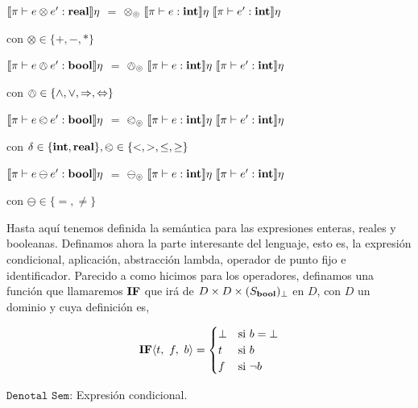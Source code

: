 $\llbracket \pi \vdash e \otimes e' : \textbf{real} \rrbracket\eta$ $=$
$\otimes_{\circledcirc} \ \llbracket \pi \vdash e : \textbf{int} \rrbracket\eta \
						\llbracket \pi \vdash e' : \textbf{int} \rrbracket\eta$

\begin{center}
con $\otimes \in \{+,-,*\}$
\end{center}

$\llbracket \pi \vdash e \owedge e' : \textbf{bool} \rrbracket\eta$ $=$
$\owedge_{\circledcirc} \ \llbracket \pi \vdash e : \textbf{int} \rrbracket\eta \
						\llbracket \pi \vdash e' : \textbf{int} \rrbracket\eta$

\begin{center}
con $\owedge \in \{\wedge,\vee,\Rightarrow,\Leftrightarrow\}$
\end{center}

$\llbracket \pi \vdash e \olessthan e' : \textbf{bool} \rrbracket\eta$ $=$ 
$\olessthan_{\circledcirc} \ \llbracket \pi \vdash e : \textbf{int} \rrbracket\eta \
						\llbracket \pi \vdash e' : \textbf{int} \rrbracket\eta$

\begin{center}
con $\delta \in \{\textbf{int}, \textbf{real} \}, \olessthan \in \{<,>,\leq,\geq\}$
\end{center}

$\llbracket \pi \vdash e \ominus e' : \textbf{bool} \rrbracket\eta$ $=$ 
$\ominus_{\circledcirc} \ \llbracket \pi \vdash e : \textbf{int} \rrbracket\eta \
						\llbracket \pi \vdash e' : \textbf{int} \rrbracket\eta$

\begin{center}
con $\ominus \in \{=,\neq\}$
\end{center}

Hasta aqu\'i tenemos definida la sem\'antica para las expresiones enteras,
reales y booleanas. Definamos ahora la parte interesante del lenguaje, esto 
es, la expresi\'on condicional, aplicaci\'on, abstracci\'on lambda, operador
de punto fijo e identificador. Parecido a como hicimos para los operadores,
definamos una funci\'on que llamaremos $\textbf{IF}$ que ir\'a de $D \times D \times (S_{\textbf{bool}})_\bot$ en
$D$, con $D$ un dominio y cuya definici\'on es,

\[
\textbf{IF} \langle t, \ f, \ b \rangle=
\begin{cases}
\bot & \text{si } b = \bot \\
t  & \text{si } b\\
f & \text{si } \neg b\\
\end{cases}
\]

\noindent
$\texttt{Denotal Sem:}$ Expresi\'on condicional.\

\

